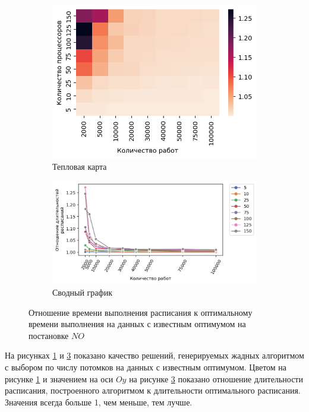 \begin{figure}[!htbp]
    \centering
    \begin{subfigure}{0.49\textwidth}
        \includegraphics[width=\textwidth]{imgs/ideal_1/NO/th.png}
        \caption{Тепловая карта}   
        \label{fig:NO-GC1-times-heatmap}
    \end{subfigure}
    \hfill
    \begin{subfigure}{0.49\textwidth}
        \includegraphics[width=\textwidth]{imgs/ideal_1/NO/gr_amalgamated.png}
        \caption{Сводный график}   
        \label{fig:NO-GC1-times-compiled} 
    \end{subfigure}
    \caption{Отношение времени выполнения расписания к оптимальному времени выполнения на данных с известным оптимумом на постановке $NO$}
\end{figure}

На рисунках \ref{fig:NO-GC1-times-heatmap} и \ref{fig:NO-GC1-times-compiled} показано качество решений, генерируемых жадных алгоритмом с выбором по числу потомков на данных с известным оптимумом. Цветом на рисунке \ref{fig:NO-GC1-times-heatmap} и значением на оси $Oy$ на рисунке \ref{fig:NO-GC1-times-compiled} показано отношение длительности расписания, построенного алгоритмом к длительности оптимального расписания. Значения всегда больше 1, чем меньше, тем лучше.

